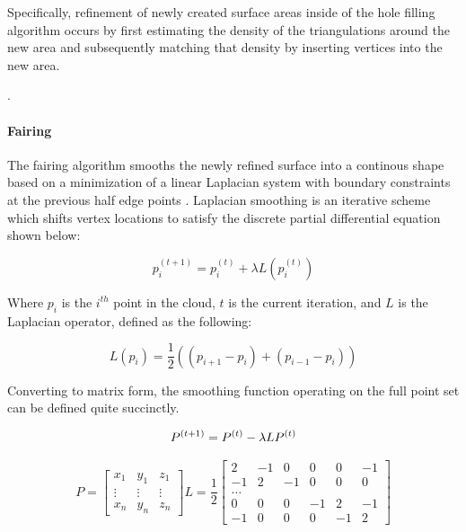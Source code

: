 \documentclass[12pt]{drexelthesis}
\begin{document}
Specifically, refinement of newly created surface areas inside of the hole filling algorithm occurs by first estimating the density of the triangulations around the new area and subsequently matching that density by inserting vertices into the new area.

\cite{meshrefinement}.

\paragraph{Fairing}
The fairing algorithm smooths the newly refined surface into a continous shape based on a minimization of a linear Laplacian system with boundary constraints at the previous half edge points \cite{meshfairing}. Laplacian smoothing is an iterative scheme which shifts vertex locations to satisfy the discrete partial differential equation shown below:

\begin{equation}
	p_{i}^{(t+1)} = p_{i}^{(t)} + \lambda L(p_{i}^{(t)})
\end{equation}

Where $p_{i}$ is the $i^{th}$ point in the cloud, $t$ is the current iteration, and $L$ is the Laplacian operator, defined as the following:

\begin{equation}
	L(p_{i}) = \frac{1}{2} ( (p_{i+1} - p_{i}) + (p_{i-1} - p_{i}) )
\end{equation}

Converting to matrix form, the smoothing function operating on the full point set can be defined quite succinctly.

\begin{equation}
	P^{(t+1)} = P^{(t)} - \lambda L P^{(t)} \\
\end{equation}

\begin{equation}
	P =  \begin{bmatrix}
		x_{1} & y_{1} & z_{1} \\
		\vdots & \vdots & \vdots \\
		x_{n} & y_{n} & z_{n}
		\end{bmatrix}    
		L = \frac{1}{2} \begin{bmatrix}
			2 	& -1 	& 0 	& 0 	& 0 	& -1 	\\
			-1 	&  2 	& -1 	& 0 	& 0 	& 0  	\\
							\hdots						\\
			0	& 0		&	0	& -1	& 2		& -1	\\
			-1	& 0 	& 0 	& 0 	& -1	& 2
			\end{bmatrix}
\end{equation}
\end{document}
